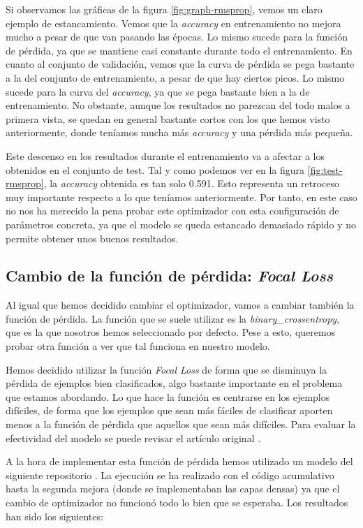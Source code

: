 \documentclass[11pt,a4paper]{article}
\begin{document}
Si observamos las gráficas de la figura \ref{fig:graph-rmsprop}, vemos un claro ejemplo de estancamiento. Vemos
que la \textit{accuracy} en entrenamiento no mejora mucho a pesar de que van pasando las épocas. Lo mismo sucede
para la función de pérdida, ya que se mantiene casi constante durante todo el entrenamiento. En cuanto al conjunto
de validación, vemos que la curva de pérdida se pega bastante a la del conjunto de entrenamiento, a pesar de que
hay ciertos picos. Lo mismo sucede para la curva del \textit{accuracy}, ya que se pega bastante bien a la de
entrenamiento. No obstante, aunque los resultados no parezcan del todo malos a primera vista, se quedan en general
bastante cortos con los que hemos visto anteriormente, donde teníamos mucha más \textit{accuracy} y una pérdida
más pequeña.

Este descenso en los resultados durante el entrenamiento va a afectar a los obtenidos en el conjunto de test.
Tal y como podemos ver en la figura \ref{fig:test-rmsprop}, la \textit{accuracy} obtenida es tan solo 0.591.
Esto representa un retroceso muy importante respecto a lo que teníamos anteriormente. Por tanto, en este caso no nos
ha merecido la pena probar este optimizador con esta configuración de parámetros concreta, ya que el modelo
se queda estancado demasiado rápido y no permite obtener unos buenos resultados.

\subsection{Cambio de la función de pérdida: \textit{Focal Loss}}

Al igual que hemos decidido cambiar el optimizador, vamos a cambiar también la función de pérdida. La función que
se suele utilizar es la \textit{binary\_crossentropy}, que es la que nosotros hemos seleccionado por defecto. Pese a
esto, queremos probar otra función a ver que tal funciona en nuestro modelo.

Hemos decidido utilizar la función \textit{Focal Loss} de forma que se disminuya la pérdida de ejemplos bien clasificados,
algo bastante importante en el problema que estamos abordando. Lo que hace la función es centrarse en los ejemplos
difíciles, de forma que los ejemplos que sean más fáciles de clasificar aporten menos a la función de pérdida que
aquellos que sean más difíciles. Para evaluar la efectividad del modelo se puede revisar el artículo original
\cite{DBLP:journals/corr/abs-1708-02002}.

A la hora de implementar esta función de pérdida hemos utilizado un modelo del siguiente repositorio \cite{focal-loss}.
La ejecución se ha realizado con el código acumulativo hasta la segunda mejora (donde se implementaban las capas densas)
ya que el cambio de optimizador no funcionó todo lo bien que se esperaba. Los resultados han sido los siguientes:
\end{document}
